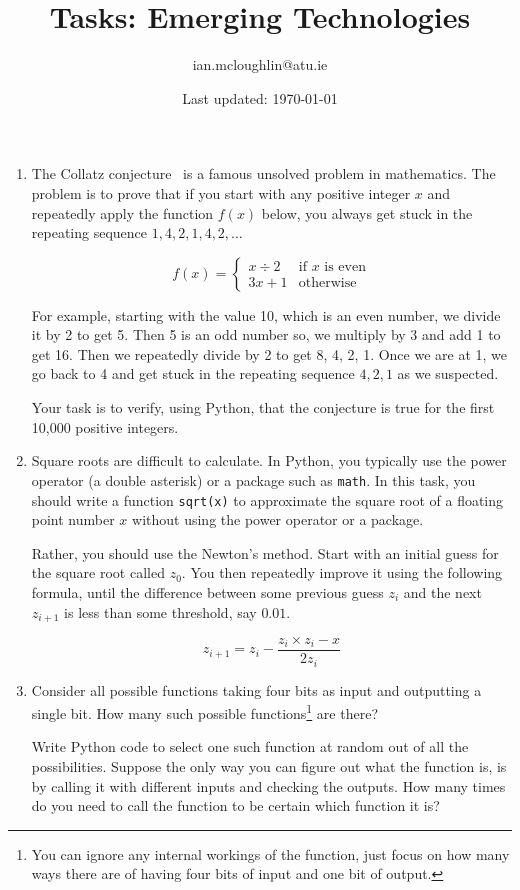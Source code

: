 \documentclass{iansnotes}
\title{Tasks: Emerging Technologies}
\author{ian.mcloughlin@atu.ie}
\date{Last updated: \today}
\begin{document}
 
\maketitle
 
\begin{enumerate}
  \item The Collatz conjecture~\autocite{quantacollatz} is a famous unsolved problem in mathematics. The problem is to prove that if you start with any positive integer $x$ and repeatedly apply the function $f(x)$ below, you always get stuck in the repeating sequence $1,4,2,1,4,2,\ldots$ 
  
  $$ f(x) = \begin{cases}
    x \div 2 & \text{if } x \text{ is even} \\
    3x + 1              & \text{otherwise} 
  \end{cases}$$

  For example, starting with the value 10, which is an even number, we divide it by 2 to get 5.
  Then 5 is an odd number so, we multiply by 3 and add 1 to get 16.
  Then we repeatedly divide by 2 to get 8, 4, 2, 1.
  Once we are at 1, we go back to 4 and get stuck in the repeating sequence $4, 2, 1$ as we suspected.

  Your task is to verify, using Python, that the conjecture is true for the first 10,000 positive integers.
  
  \item Square roots are difficult to calculate. In Python, you typically use the power operator (a double asterisk) or a package such as \texttt{math}. In this task\autocite{golangnewton}, you should write a function \texttt{sqrt(x)} to approximate the square root of a floating point number $x$ without using the power operator or a package.
  
  Rather, you should use the Newton's method\autocite{newtonsqrt}. Start with an initial guess for the square root called $z_0$. You then repeatedly improve it using the following formula, until the difference between some previous guess $z_i$ and the next $z_{i+1}$ is less than some threshold, say $0.01$.
  
  $$ z_{i+1} = z_i -  \frac{z_i \times z_i - x}{2 z_i}$$

  \item Consider all possible functions taking four bits as input and outputting a single bit. How many such possible functions\footnote{You can ignore any internal workings of the function, just focus on how many ways there are of having four bits of input and one bit of output.} are there?
  
  Write Python code to select one such function at random out of all the possibilities. Suppose the only way you can figure out what the function is, is by calling it with different inputs and checking the outputs. How many times do you need to call the function to be certain which function it is?

\end{enumerate}
\end{document}
